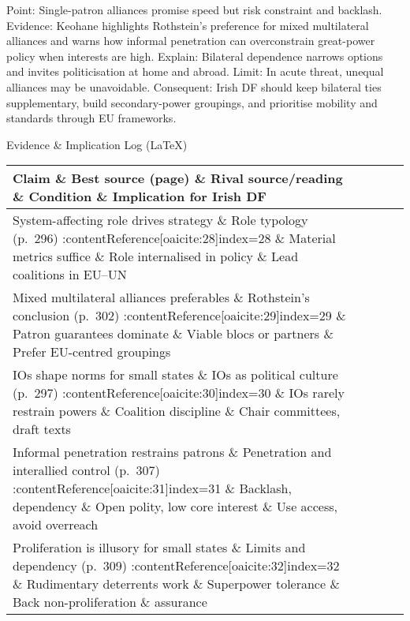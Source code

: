 Point: Single-patron alliances promise speed but risk constraint and backlash.
Evidence: Keohane highlights Rothstein’s preference for mixed multilateral alliances and warns how informal penetration can overconstrain great-power policy when interests are high.
Explain: Bilateral dependence narrows options and invites politicisation at home and abroad.
Limit: In acute threat, unequal alliances may be unavoidable.
Consequent: Irish DF should keep bilateral ties supplementary, build secondary-power groupings, and prioritise mobility and standards through EU frameworks.

Evidence \& Implication Log (LaTeX)
\begin{tabular}{p{3.2cm}p{4.2cm}p{3.6cm}p{3.2cm}p{4.2cm}}
	\textbf{Claim} \& \textbf{Best source (page)} \& \textbf{Rival source/reading} \& \textbf{Condition} \& \textbf{Implication for Irish DF}\\\hline
	System-affecting role drives strategy \& Role typology (p.~296) :contentReference[oaicite:28]{index=28} \& Material metrics suffice \& Role internalised in policy \& Lead coalitions in EU–UN\\
	Mixed multilateral alliances preferables \& Rothstein’s conclusion (p.~302) :contentReference[oaicite:29]{index=29} \& Patron guarantees dominate \& Viable blocs or partners \& Prefer EU-centred groupings\\
	IOs shape norms for small states \& IOs as political culture (p.~297) :contentReference[oaicite:30]{index=30} \& IOs rarely restrain powers \& Coalition discipline \& Chair committees, draft texts\\
	Informal penetration restrains patrons \& Penetration and interallied control (p.~307) :contentReference[oaicite:31]{index=31} \& Backlash, dependency \& Open polity, low core interest \& Use access, avoid overreach\\
	Proliferation is illusory for small states \& Limits and dependency (p.~309) :contentReference[oaicite:32]{index=32} \& Rudimentary deterrents work \& Superpower tolerance \& Back non-proliferation \& assurance\\
\end{tabular}


\parencite{HLAP_2022}

